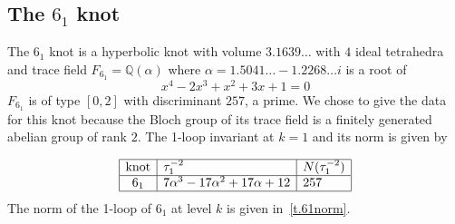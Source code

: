 \documentclass[12pt]{amsart}
\theoremstyle{definition}
\def\BQ{\mathbb Q}
\def\a{\alpha}
\def\be{  \begin{equation} }
\def\ee{  \end{equation} }
\begin{document}
\subsection{The $6_1$ knot}
\label{sub.61}

The $6_1$ knot is a hyperbolic knot with
volume $3.1639\dots$ with $4$ ideal tetrahedra and trace
field $F_{6_1}=\BQ(\a)$ where $\a=1.5041\dots - 1.2268\dots i$ is a root of 
$$
x^4 - 2 x^3 + x^2 + 3 x + 1 = 0
$$
$F_{6_1}$ is of type $[0,2]$ with discriminant $257$, a prime. We chose
to give the data for this knot because the Bloch group of its trace
field is a finitely generated abelian group of rank $2$.
The 1-loop invariant at $k=1$ and its norm is given by

\be
\label{eq.1loop61}
\begin{array}{|c|l|l|} \hline
\text{knot} & \tau_1^{-2} & N(\tau_1^{-2}) \\ \hline
6_1 & 7 \a^3 - 17 \a^2 + 17 \a + 12 & 257  \\ \hline
\end{array} 
\ee
The norm of the 1-loop of $6_1$ at level $k$ is given in~\eqref{t.61norm}.
\end{document}
